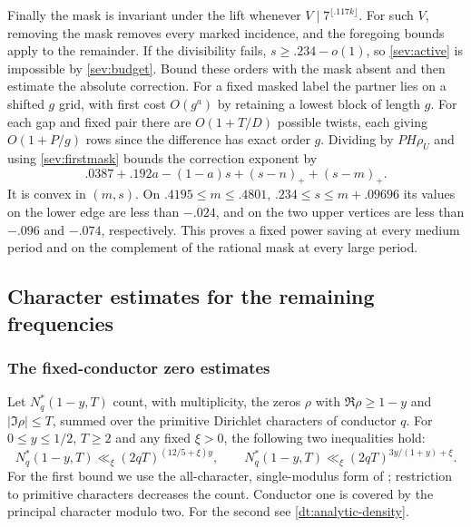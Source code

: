 \documentclass[11pt,a4paper]{article}
\theoremstyle{paperplain}
\numberwithin{equation}{section}
\begin{document}
Finally the mask is invariant under the lift whenever
$V\mid 7^{\lfloor.117k\rfloor}$. For such $V$, removing the mask
removes every marked incidence, and the foregoing bounds apply to
the remainder. If the divisibility fails, $s\ge .234-o(1)$, so
\eqref{sev:active} is impossible by \eqref{sev:budget}. Bound these
orders with the mask absent and then estimate the absolute correction.
For a fixed masked label the partner lies on a shifted $g$ grid,
with first cost $O(g^a)$ by retaining a lowest block of length $g$.
For each gap and fixed pair there are $O(1+T/D)$ possible twists,
each giving $O(1+P/g)$ rows since the difference has exact order $g$.
Dividing by $PH\rho_U$ and using \eqref{sev:firstmask}
bounds the correction exponent by
\[
 .0387+.192a-(1-a)s+(s-n)_++(s-m)_+ .
\]
It is convex in $(m,s)$. On
$.4195\le m\le .4801$, $.234\le s\le m+.09696$
its values on the lower edge are less than $-.024$, and on the
two upper vertices are less than $-.096$ and $-.074$, respectively.
This proves a fixed power saving at every medium period and on
the complement of the rational mask at every large period.


\subsection{Character estimates for the remaining frequencies}

\subsubsection{The fixed-conductor zero estimates}
\label{bseven:external-density}
Let $N^*_q(1-y,T)$ count, with multiplicity, the zeros $\rho$ with
$\Re\rho\geq 1-y$ and $|\Im\rho|\leq T$, summed over the primitive
Dirichlet characters of conductor $q$. For $0\leq y\leq 1/2$, $T\geq2$
and any fixed $\xi>0$, the following two inequalities hold:
\[
 N_q^*(1-y,T)\ll_\xi (2qT)^{(12/5+\xi)y},
 \qquad
 N_q^*(1-y,T)\ll_\xi (2qT)^{3y/(1+y)+\xi}.
\]
For the first bound we use the all-character, single-modulus
form of \cite[Theorem~2.1]{ThornerZaman}; restriction to primitive
characters decreases the count. Conductor one is covered by the principal
character modulo two. For the second see \eqref{dt:analytic-density}.
\end{document}
